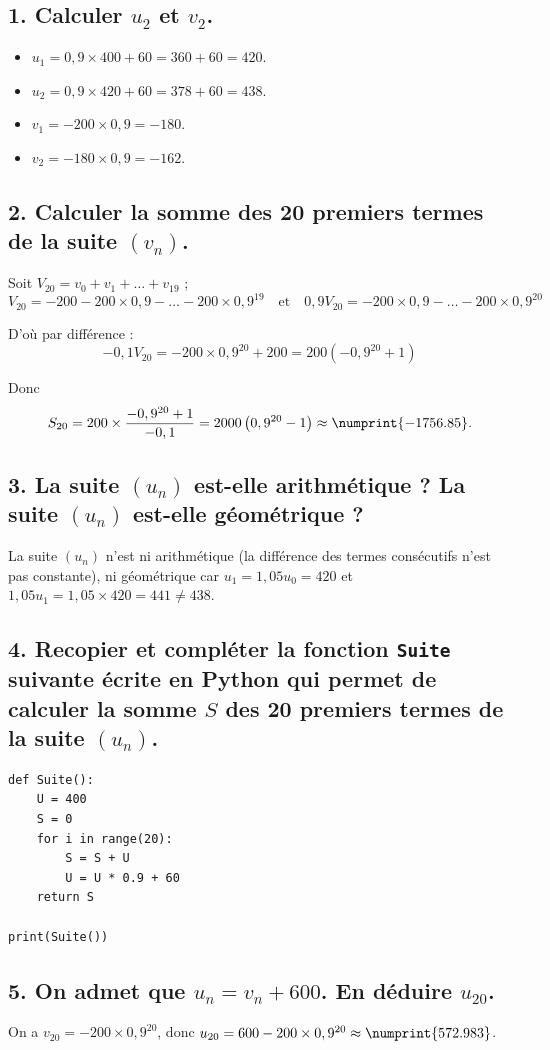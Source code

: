 \subsection*{1. Calculer $u_2$ et $v_2$.}
	
	\begin{itemize}
		\item $u_1 = 0,9 \times 400 + 60 = 360 + 60 = 420$.
		\item $u_2 = 0,9 \times 420 + 60 = 378 + 60 = 438$.
		\item $v_1 = -200 \times 0,9 = -180$.
		\item $v_2 = -180 \times 0,9 = -162$.
	\end{itemize}
	
	\subsection*{2. Calculer la somme des 20 premiers termes de la suite $(v_n)$.}
	
	Soit $V_{20} = v_0 + v_1 + \ldots + v_{19}$ ;
	\[
	V_{20} = -200 - 200 \times 0,9 - \ldots - 200 \times 0,9^{19} \quad \text{et} \quad 0,9V_{20} = -200 \times 0,9 - \ldots - 200 \times 0,9^{20}
	\]
	
	D'où par différence :
	\[
	-0,1V_{20} = -200 \times 0,9^{20} + 200 = 200 \left( -0,9^{20} + 1 \right)
	\]
	
	Donc
	\[
	S_{20} = 200 \times \dfrac{-0,9^{20} + 1}{-0,1} = 2000 \left( 0,9^{20} - 1 \right) \approx \numprint{-1756.85}.
	\]
	
	\subsection*{3. La suite $(u_n)$ est-elle arithmétique ? La suite $(u_n)$ est-elle géométrique ?}
	
	La suite $(u_n)$ n'est ni arithmétique (la différence des termes consécutifs n'est pas constante), ni géométrique car $u_1 = 1,05u_0 = 420$ et $1,05u_1 = 1,05 \times 420 = 441 \neq 438$.
	
	\subsection*{4. Recopier et compléter la fonction \texttt{Suite} suivante écrite en Python qui permet de calculer la somme $S$ des 20 premiers termes de la suite $(u_n)$.}
	
	\begin{lstlisting}[style=python]
def Suite():
	U = 400
	S = 0
	for i in range(20):
		S = S + U
		U = U * 0.9 + 60
	return S
		
print(Suite())
	\end{lstlisting}
	
	\subsection*{5. On admet que $u_n = v_n + 600$. En déduire $u_{20}$.}
	
	On a $v_{20} = -200 \times 0,9^{20}$, donc $u_{20} = 600 - 200 \times 0,9^{20} \approx \numprint{572.983}$.
